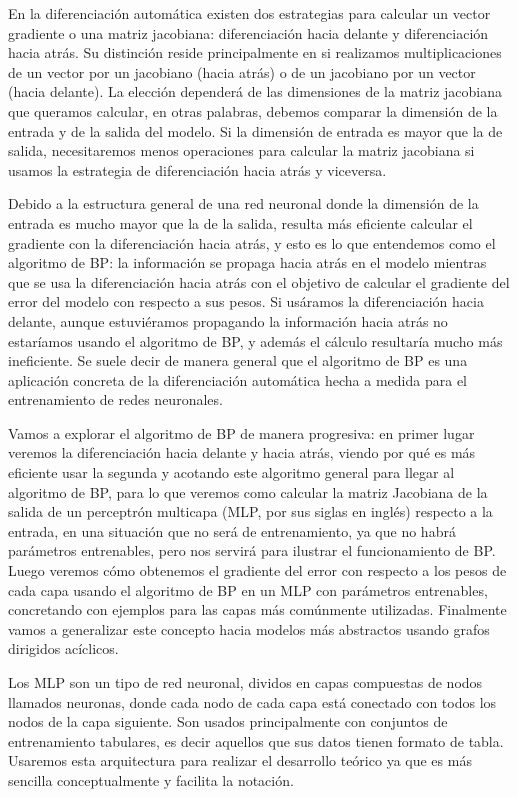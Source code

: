 En la diferenciación automática existen dos estrategias para calcular un vector gradiente o una matriz jacobiana: diferenciación hacia delante y diferenciación hacia atrás. Su distinción reside  principalmente en si realizamos multiplicaciones de un vector por un jacobiano (hacia atrás) o de un jacobiano por un vector (hacia delante). La elección dependerá de las dimensiones de la matriz jacobiana que queramos calcular, en otras palabras, debemos comparar la dimensión de la entrada y de la salida del modelo. Si la dimensión de entrada es mayor que la de salida, necesitaremos menos operaciones para calcular la matriz jacobiana si usamos la estrategia de diferenciación hacia atrás y viceversa. 

Debido a la estructura general de una red neuronal donde la dimensión de la entrada es mucho mayor que la de la salida, resulta más eficiente calcular el gradiente con la diferenciación hacia atrás, y esto es lo que entendemos como el algoritmo de BP: la información se propaga hacia atrás en el modelo mientras que se usa la diferenciación hacia atrás con el objetivo de calcular el gradiente del error del modelo con respecto a sus pesos. Si usáramos la diferenciación hacia delante, aunque estuviéramos propagando la información hacia atrás no estaríamos usando el algoritmo de BP, y además el cálculo resultaría mucho más ineficiente. Se suele decir de manera general que el algoritmo de BP es una aplicación concreta de la diferenciación automática hecha a medida para el entrenamiento de redes neuronales.


Vamos a explorar el algoritmo de BP de manera progresiva: en primer lugar veremos la diferenciación hacia delante y hacia atrás, viendo por qué es más eficiente usar la segunda y acotando este algoritmo general para llegar al algoritmo de BP, para lo que veremos como calcular la matriz Jacobiana de la salida de un perceptrón multicapa (MLP, por sus siglas en inglés) respecto a la entrada, en una situación que no será de entrenamiento, ya que no habrá parámetros entrenables, pero nos servirá para ilustrar el funcionamiento de BP. Luego veremos cómo obtenemos el gradiente del error con respecto a los pesos de cada capa usando el algoritmo de BP en un MLP con parámetros entrenables, concretando con ejemplos para las capas más comúnmente utilizadas. Finalmente vamos a generalizar este concepto hacia modelos más abstractos usando grafos dirigidos acíclicos. 


Los MLP son un tipo de red neuronal, dividos en capas compuestas de nodos llamados neuronas, donde cada nodo de cada capa está conectado con todos los nodos de la capa siguiente. Son usados principalmente con conjuntos de entrenamiento tabulares, es decir aquellos que sus datos tienen formato de tabla. Usaremos esta arquitectura para realizar el desarrollo teórico ya que es más sencilla conceptualmente y facilita la notación. 

